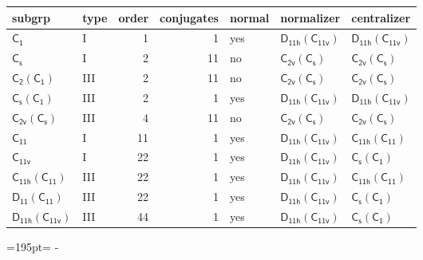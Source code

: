 \documentclass[10pt,a4paper]{article}
\newcommand{\needspace}[1]{\par\penalty-100\begingroup\dimen0=#1\relax\dimen2=\pagegoal
  \advance\dimen2-\pagetotal\ifdim\dimen0>\dimen2\relax\ifdim\dimen2>0pt\vfil\break\fi\fi
  \endgroup}
\numberwithin{equation}{section}
\newcommand{\grp}[1]{\mathsf{#1}}
\begin{document}
{\small\begin{longtable}{@{}llrrlll@{}}\toprule
subgrp & type & order & conjugates & normal & normalizer & centralizer\\\midrule\endhead
\bottomrule\endfoot\endlastfoot
\href{../../../rotation/data/pdf/C1.pdf}{$\grp{C_{1}}$} & I & 1 & 1 & yes & \href{D11h-C11v.pdf}{$\grp{D_{11h}}(\grp{C_{11v}})$} & \href{D11h-C11v.pdf}{$\grp{D_{11h}}(\grp{C_{11v}})$}\\*
\href{../../../rotation/data/pdf/C1v.pdf}{$\grp{C_{s}}$} & I & 2 & 11 & no & \href{C2v-C1v.pdf}{$\grp{C_{2v}}(\grp{C_{s}})$} & \href{C2v-C1v.pdf}{$\grp{C_{2v}}(\grp{C_{s}})$}\\*
\href{C2-C1.pdf}{$\grp{C_{2}}(\grp{C_{1}})$} & III & 2 & 11 & no & \href{C2v-C1v.pdf}{$\grp{C_{2v}}(\grp{C_{s}})$} & \href{C2v-C1v.pdf}{$\grp{C_{2v}}(\grp{C_{s}})$}\\*
\href{C1v-C1.pdf}{$\grp{C_{s}}(\grp{C_{1}})$} & III & 2 & 1 & yes & \href{D11h-C11v.pdf}{$\grp{D_{11h}}(\grp{C_{11v}})$} & \href{D11h-C11v.pdf}{$\grp{D_{11h}}(\grp{C_{11v}})$}\\*
\href{C2v-C1v.pdf}{$\grp{C_{2v}}(\grp{C_{s}})$} & III & 4 & 11 & no & \href{C2v-C1v.pdf}{$\grp{C_{2v}}(\grp{C_{s}})$} & \href{C2v-C1v.pdf}{$\grp{C_{2v}}(\grp{C_{s}})$}\\*
\href{../../../rotation/data/pdf/C11.pdf}{$\grp{C_{11}}$} & I & 11 & 1 & yes & \href{D11h-C11v.pdf}{$\grp{D_{11h}}(\grp{C_{11v}})$} & \href{C11h-C11.pdf}{$\grp{C_{11h}}(\grp{C_{11}})$}\\*
\href{../../../rotation/data/pdf/C11v.pdf}{$\grp{C_{11v}}$} & I & 22 & 1 & yes & \href{D11h-C11v.pdf}{$\grp{D_{11h}}(\grp{C_{11v}})$} & \href{C1v-C1.pdf}{$\grp{C_{s}}(\grp{C_{1}})$}\\*
\href{C11h-C11.pdf}{$\grp{C_{11h}}(\grp{C_{11}})$} & III & 22 & 1 & yes & \href{D11h-C11v.pdf}{$\grp{D_{11h}}(\grp{C_{11v}})$} & \href{C11h-C11.pdf}{$\grp{C_{11h}}(\grp{C_{11}})$}\\*
\href{D11-C11.pdf}{$\grp{D_{11}}(\grp{C_{11}})$} & III & 22 & 1 & yes & \href{D11h-C11v.pdf}{$\grp{D_{11h}}(\grp{C_{11v}})$} & \href{C1v-C1.pdf}{$\grp{C_{s}}(\grp{C_{1}})$}\\*
\href{D11h-C11v.pdf}{$\grp{D_{11h}}(\grp{C_{11v}})$} & III & 44 & 1 & yes & \href{D11h-C11v.pdf}{$\grp{D_{11h}}(\grp{C_{11v}})$} & \href{C1v-C1.pdf}{$\grp{C_{s}}(\grp{C_{1}})$}\\
\bottomrule\end{longtable}}
\needspace{195pt}
\end{document}

